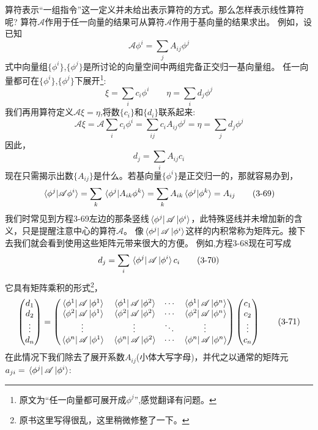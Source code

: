 算符表示“一组指令”这一定义并未给出表示算符的方式。那么怎样表示线性算符呢?
算符$\mathscr{A}$作用于任一向量的结果可从算符$\mathscr{A}$作用于基向量的结果求出。
例如，设已知
\[\mathscr{A}\phi^i=\sum_jA_{ij}\phi^j \tag{3-65}\]
式中向量组$\{\phi^i\}$,$\{\phi^j\}$是所讨论的向量空间中两组完备正交归一基向量组。
任一向量都可在$\{\phi^i\}$,$\{\phi^j\}$下展开\footnote{原文为“任一向量都可展开成$\phi^j$”,感觉翻译有问题。}:
\[\xi=\sum_ic_i\phi^i \qquad \eta=\sum_id_j\phi^j \tag{3-66}\]
我们再用算符定义$\mathscr{A}\xi=\eta$,将数$\{c_i\}$和$\{d_i\}$联系起来:
\[\mathscr{A}\xi=\mathscr{A}\sum_ic_i\phi^i=\sum_{ij}c_iA_{ij}\phi^j=\eta=\sum_jd_j\phi^j \tag{3-67}\]
因此，
\[d_j=\sum_iA_{ij}c_i \tag{3-68}\]
现在只需揭示出数$\{A_{ij}\}$是什么。若基向量$\{\phi^i\}$是正交归一的，那就容易办到，
\[\bra*{\phi^j}\ket*{\mathscr{A}\phi^i}=\sum_k\bra*{\phi^j}\ket*{A_{ik}\phi^k}=\sum_kA_{ik}\bra*{\phi^j}\ket*{\phi^k}=A_{ij} \tag{3-69}\]
我们时常见到方程3-69左边的那条竖线$\bra*{\phi^j}\mathscr{A}\ket*{\phi^i}$，此特殊竖线并未增加新的含义，只是提醒注意中心的算符$\mathscr{A}$。
像$\bra*{\phi^j}\mathscr{A}\ket*{\phi^i}$这样的内积常称为矩阵元。接下去我们就会看到使用这些矩阵元带来很大的方便。
例如,方程3-68现在可写成
\[d_j=\sum_i\bra*{\phi^j}\mathscr{A}\ket*{\phi^i}c_i \tag{3-70}\]
它具有矩阵乘积的形式\footnote{原书这里写得很乱，这里稍微修整了一下。}，
\[
\begin{pmatrix}
    d_1 \\ d_2 \\ \vdots \\ d_n
\end{pmatrix}    
=
\begin{pmatrix}
    \bra*{\phi^1}\mathscr{A}\ket*{\phi^1} & \bra*{\phi^1}\mathscr{A}\ket*{\phi^2} & \cdots & \bra*{\phi^1}\mathscr{A}\ket*{\phi^n} \\
    \bra*{\phi^2}\mathscr{A}\ket*{\phi^1} & \bra*{\phi^2}\mathscr{A}\ket*{\phi^2} & \cdots & \bra*{\phi^2}\mathscr{A}\ket*{\phi^n} \\
    \vdots & \vdots & \ddots & \vdots \\
    \bra*{\phi^n}\mathscr{A}\ket*{\phi^1} & \bra*{\phi^n}\mathscr{A}\ket*{\phi^2} & \cdots & \bra*{\phi^n}\mathscr{A}\ket*{\phi^n}
\end{pmatrix}
\begin{pmatrix}
    c_1 \\ c_2 \\ \vdots \\ c_n
\end{pmatrix} 
\tag{3-71}
\]
在此情况下我们除去了展开系数$A_{ij}$(小体大写字母)，并代之以通常的矩阵元$a_{ji}=\bra*{\phi^j}\mathscr{A}\ket*{\phi^i}$:
